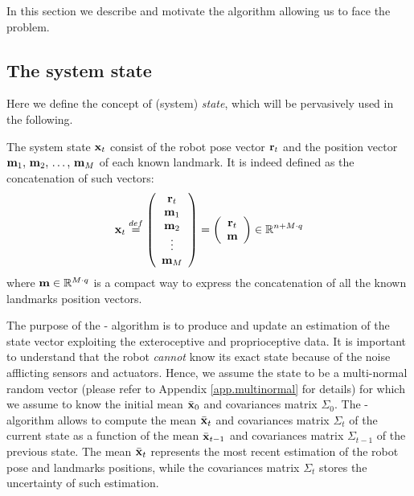 In this section we describe and motivate the \EKF{} algorithm allowing us to face the \SLAM{} problem.

\subsection{The system state}
	Here we define the concept of (system) \emph{state}, which will be pervasively used in the following.
	
	The system state $\boldsymbol{\mathrm{{x}}}_t$ consist of the robot pose vector $\boldsymbol{\mathrm{{r}}}_t$ and the position vector $\boldsymbol{\mathrm{{m}}}_{1},\, \boldsymbol{\mathrm{{m}}}_{2},\, \ldots,\, \boldsymbol{\mathrm{{m}}}_{M}$ of each known landmark. It is indeed defined as the concatenation of such vectors:
	\[
		\boldsymbol{\mathrm{{x}}}_t \stackrel{def}{=}
		\left(\begin{array}{c}
			\boldsymbol{\mathrm{{r}}}_t \\ \boldsymbol{\mathrm{{m}}}_{1} \\ \boldsymbol{\mathrm{{m}}}_{2} \\ \vdots \\ \boldsymbol{\mathrm{{m}}}_{M}
		\end{array}\right)
		=
		\left(\begin{array}{c}
			\boldsymbol{\mathrm{{r}}}_t \\ \boldsymbol{\mathrm{{m}}}
		\end{array}\right)
		\in \mathbb{R}^{n + M \cdot q}
	\]
	where $\boldsymbol{\mathrm{{m}}} \in \mathbb{R}^{M \cdot q}$ is a compact way to express the concatenation of all the known landmarks position vectors.
	
	The purpose of the \EKF-\SLAM{} algorithm is to produce and update an estimation of the state vector exploiting the exteroceptive and proprioceptive data. 
	It is important to understand that the robot \emph{cannot} know its exact state because of the noise afflicting sensors and actuators.
	Hence, we assume the state to be a multi-normal random vector (please refer to Appendix \ref{app.multinormal} for details) for which we assume to know the initial mean $\bar{\boldsymbol{\mathrm{{x}}}}_0$ and covariances matrix $\Sigma_0$.
	The \EKF-\SLAM{} algorithm allows to compute the mean $\bar{\boldsymbol{\mathrm{{x}}}}_t$ and covariances matrix $\Sigma_t$ of the current state as a function of the mean $\bar{\boldsymbol{\mathrm{{x}}}}_{t - 1}$ and covariances matrix $\Sigma_{t - 1}$ of the previous state.
	The mean $\bar{\boldsymbol{\mathrm{{x}}}}_t$ represents the most recent estimation of the robot pose and landmarks positions, while the covariances matrix $\Sigma_t$ stores the uncertainty of such estimation.
	
